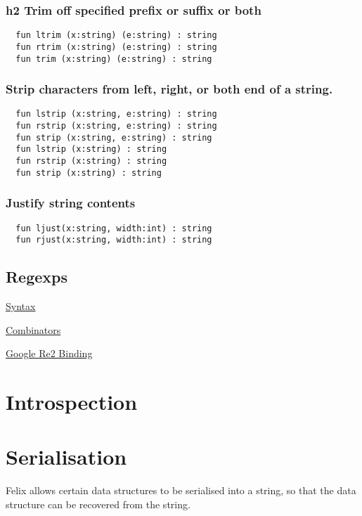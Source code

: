 \documentclass[oneside]{book}
\begin{document}
\subsection{h2 Trim off specified prefix or suffix or both}
\begin{verbatim}
  fun ltrim (x:string) (e:string) : string 
  fun rtrim (x:string) (e:string) : string
  fun trim (x:string) (e:string) : string
\end{verbatim}

\subsection{Strip characters from left, right, or both end of a string.}
\begin{verbatim}
  fun lstrip (x:string, e:string) : string
  fun rstrip (x:string, e:string) : string
  fun strip (x:string, e:string) : string
  fun lstrip (x:string) : string
  fun rstrip (x:string) : string
  fun strip (x:string) : string
\end{verbatim}

\subsection{Justify string contents}
\begin{verbatim}
  fun ljust(x:string, width:int) : string
  fun rjust(x:string, width:int) : string
\end{verbatim}

\section{Regexps}

\href{http://felix-lang.org/share/lib/grammar/regexps.fsyn}{Syntax}

\href{http://felix-lang.org/share/lib/std/strings/regdef.flx}{Combinators}

\href{http://felix-lang.org/share/lib/std/strings/re2.flx}{Google Re2 Binding}

\chapter{Introspection}

\chapter{Serialisation}
Felix allows certain data structures to be serialised into a string,
so that the data structure can be recovered from the string.
\end{document}
